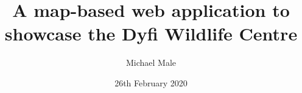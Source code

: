 
\title{A map-based web application to showcase the Dyfi Wildlife Centre}

\author{Michael Male}




\date{26th February 2020} %




\maketitle


